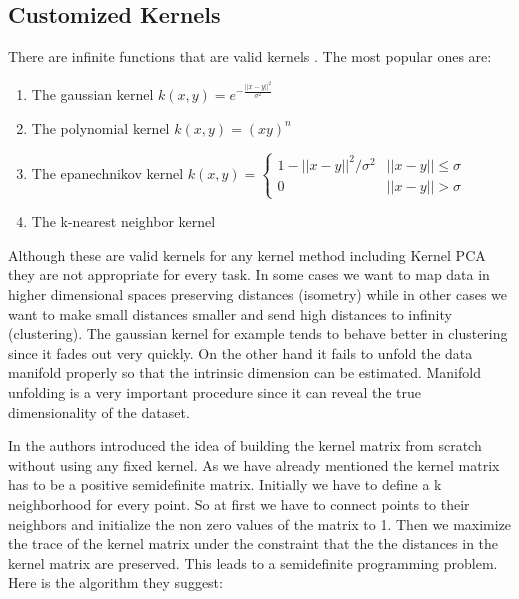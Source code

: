 \documentclass[12pt,letterpaper,doublespaced,ETD,dvips,proposal]{gtthesis}
\begin{document}
\begin{Body}
\subsection{Customized Kernels}
\label{Customized_Kernels}
There are infinite functions
that are valid kernels \cite{shawetaylor2004kmp}. The most popular ones are:
\begin{enumerate}
  \item The gaussian kernel $k(x, y)=e^{-\frac{||x-y||^2}{\sigma^2}}$
  \item The polynomial kernel $k(x, y)=(xy)^n$
  \item The epanechnikov kernel $k(x, y)=\left\{ \begin{array}{cc}
                                                  1-||x-y||^2/\sigma^2 & ||x-y||\leq\sigma \\
                                                  0                    & ||x-y||>\sigma
                                                \end{array} \right.$
  \item The k-nearest neighbor kernel
\end{enumerate}
Although these are valid kernels for any kernel method including
Kernel PCA they are not appropriate for every task. In some cases we
want to map data in higher dimensional spaces preserving distances
(isometry) while in other cases we want to make small distances
smaller and send high distances to infinity (clustering). The
gaussian kernel for example tends to behave better in clustering
since it fades out very quickly. On the other hand it fails to
unfold the data manifold properly so that the intrinsic dimension
can be estimated. Manifold unfolding is a very important procedure
since it can reveal the true dimensionality of the dataset.

In \cite{weinberger2004lkm} the authors introduced the idea of building the kernel matrix
from scratch without using any fixed kernel. As we have already
mentioned the kernel matrix has to be a positive semidefinite
matrix. Initially we have to define a k neighborhood  for every
point. So at first we have to connect points to their neighbors and
initialize the non zero values of the matrix to 1. Then we
maximize the trace of the kernel matrix under the constraint that
the the distances in the kernel matrix are preserved. This leads to
a semidefinite programming problem. Here is the algorithm they
suggest:

\vspace{1cm}
\vspace{1cm}


\end{Body}
\end{document}
